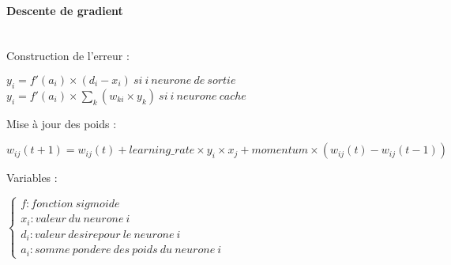 \paragraph{Descente de gradient} \cite{Touzet_1992} \\
  Construction de l'erreur : 
    \begin{center}
      $y_{i} = f'(a_i) \times ( d_i - x_i ) \ si\ i\ neurone\ de\ sortie $ \\
      $y_{i} = f'(a_i) \times \sum \limits_{k} ( w_{ki} \times y_k )\ si\ i\ neurone\ cache $
    \end{center}
  Mise à jour des poids :
    \begin{center}
      $w_{ij}(t+1) = w_{ij}(t) + learning\_rate \times y_{i} \times x_j + momentum \times 
      (w_{ij}(t) - w_{ij}(t-1) )$
    \end{center}
  Variables : 
    \begin{center}
      $\left\lbrace \begin{array}{lll} 
	f : fonction\ sigmoide \\
	x_i : valeur\ du\ neurone\ i\\
	d_i : valeur\ desire pour\ le\ neurone\ i\\
	a_i : somme\ pondere\ des\ poids\ du\ neurone\ i
      \end{array} \right.$
    \end{center}